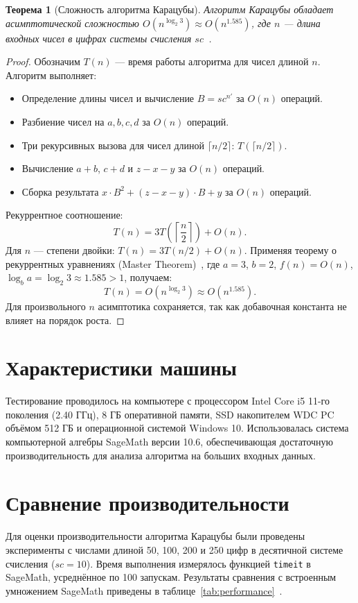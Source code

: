 \documentclass[11pt]{article}
\newtheorem{theorem}{Теорема}
\begin{document}
\begin{theorem}[Сложность алгоритма Карацубы]
\label{thm:complexity}
Алгоритм Карацубы обладает асимптотической сложностью $O(n^{\log_2 3}) \approx O(n^{1.585})$, где $n$ — длина входных чисел в цифрах системы счисления $sc$~\cite{knuth1997}.
\end{theorem}

\begin{proof}
Обозначим $T(n)$ — время работы алгоритма для чисел длиной $n$. Алгоритм выполняет:
\begin{itemize}
    \item Определение длины чисел и вычисление $B = sc^{n'}$ за $O(n)$ операций.
    \item Разбиение чисел на $a, b, c, d$ за $O(n)$ операций.
    \item Три рекурсивных вызова для чисел длиной $\lceil n/2 \rceil$: $T(\lceil n/2 \rceil)$.
    \item Вычисление $a + b$, $c + d$ и $z - x - y$ за $O(n)$ операций.
    \item Сборка результата $x \cdot B^2 + (z - x - y) \cdot B + y$ за $O(n)$ операций.
\end{itemize}

Рекуррентное соотношение:
\[
T(n) = 3T\left(\left\lceil \frac{n}{2} \right\rceil\right) + O(n).
\]
Для $n$ — степени двойки: $T(n) = 3T(n/2) + O(n)$. Применяя теорему о рекуррентных уравнениях (Master Theorem)~\cite{cormen2009}, где $a = 3$, $b = 2$, $f(n) = O(n)$, $\log_b a = \log_2 3 \approx 1.585 > 1$, получаем:
\[
T(n) = O(n^{\log_2 3}) \approx O(n^{1.585}).
\]
Для произвольного $n$ асимптотика сохраняется, так как добавочная константа не влияет на порядок роста.
\end{proof}

\section{Характеристики машины}
Тестирование проводилось на компьютере с процессором Intel Core i5 11-го поколения (2.40 ГГц), 8 ГБ оперативной памяти, SSD накопителем WDC PC объёмом 512 ГБ и операционной системой Windows 10. Использовалась система компьютерной алгебры SageMath версии 10.6, обеспечивающая достаточную производительность для анализа алгоритма на больших входных данных.

\section{Сравнение производительности}
Для оценки производительности алгоритма Карацубы были проведены эксперименты с числами длиной 50, 100, 200 и 250 цифр в десятичной системе счисления ($sc = 10$). Время выполнения измерялось функцией \texttt{timeit} в SageMath, усреднённое по 100 запускам. Результаты сравнения с встроенным умножением SageMath приведены в таблице~\ref{tab:performance}~\cite{cormen2009}.
\end{document}
